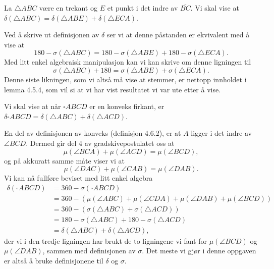 \begin{oppgave}[4.8.1]
    La $\triangle ABC$ være en trekant og $E$ et punkt i det indre av $\overline{BC}$. 
    Vi skal vise at $\delta(\triangle ABC)=\delta(\triangle ABE)+\delta(\triangle ECA)$. 

    Ved å skrive ut definisjonen av $\delta$ ser vi at denne påstanden er ekvivalent med å vise at 
    $$180 - \sigma(\triangle ABC) = 180-\sigma(\triangle ABE)+180-\sigma(\triangle ECA).$$
    Med litt enkel algebraisk manipulasjon kan vi kan skrive om denne ligningen til
    $$\sigma(\triangle ABC)+180 = \sigma(\triangle ABE)+\sigma(\triangle ECA).$$
    Denne siste likningen, som vi altså må vise at stemmer, er nettopp innholdet i lemma 4.5.4, som vil si at vi har vist resultatet vi var ute etter å vise. 
\end{oppgave}

\begin{oppgave}[4.8.2]
    Vi skal vise at når $\square ABCD$ er en konveks firkant, er $\delta \square ABCD = \delta (\triangle ABC)+\delta(\triangle ACD)$. 

    \begin{figure}[H]
        \centering
          
    \end{figure}

    En del av definisjonen av konveks (definisjon 4.6.2), er at $A$ ligger i det indre av $\angle BCD$. 
    Dermed gir del 4 av gradskivepostulatet oss at 
    $$\mu(\angle BCA)+\mu(\angle ACD)=\mu(\angle BCD),$$
    og på akkuratt samme måte viser vi at 
    $$\mu(\angle DAC)+\mu(\angle CAB)=\mu(\angle DAB).$$
    Vi kan nå fullføre beviset med litt enkel algebra
    \begin{align*}
        \delta(\square ABCD)
        &= 360 - \sigma(\square ABCD) \\
        &= 360 - (\mu(\angle ABC)+\mu(\angle CDA)+\mu(\angle DAB)+\mu(\angle BCD))\\
        &= 360 - (\sigma(\triangle ABC)+\sigma(\triangle ACD))\\
        &= 180 - \sigma(\triangle ABC)+ 180-\sigma(\triangle ACD)\\
        &= \delta(\triangle ABC)+\delta(\triangle ACD),
    \end{align*}
    der vi i den tredje ligningen har brukt de to ligningene vi fant for $\mu(\angle BCD)$ og $\mu(\angle DAB)$, sammen med definisjonen av $\sigma$.
    Det meste vi gjør i denne oppgaven er altså å bruke definisjonene til $\delta$ og $\sigma$. 
\end{oppgave}

